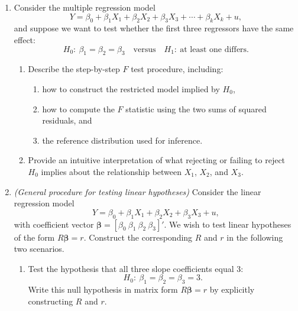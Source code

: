 \documentclass[12pt]{article}
\newcommand{\bs}[1]{\bm{#1}}
\renewcommand{\b}{\ensuremath{\bs{\beta}}}
\begin{document}
\begin{enumerate}
\begin{enumerate}\itemsep7em
\item Explain in words what this hypothesis is asking about the explanatory power of the regressors.
\item Describe step-by-step how to conduct the $F$ test for this hypothesis, including:
  \begin{enumerate}\itemsep6em
    \item the unrestricted and restricted models,  
    \item how to compute the $F$ statistic from the two sum of squared residuals, and  
    \item how to determine whether to reject $H_0$ at significance level $\alpha$.
  \end{enumerate}
\item Interpret the meaning of rejecting versus not rejecting $H_0$ in terms of the overall explanatory power of $X_1,\ldots,X_k$.
\end{enumerate}

\clearpage
\item Consider the multiple regression model
\[
Y = \beta_0 + \beta_1 X_1 + \beta_2 X_2 + \beta_3 X_3 + \cdots + \beta_k X_k + u,
\]
and suppose we want to test whether the first three regressors have the same effect:
\[
H_0:\ \beta_1=\beta_2=\beta_3 \quad \text{versus} \quad H_1:\ \text{at least one differs.}
\]

\begin{enumerate}\itemsep7em
\item Describe the step-by-step $F$ test procedure, including:
  \begin{enumerate}\itemsep6em
    \item how to construct the restricted model implied by $H_0$,
    \item how to compute the $F$ statistic using the two sums of squared residuals, and
    \item the reference distribution used for inference.
  \end{enumerate}
\item Provide an intuitive interpretation of what rejecting or failing to reject $H_0$ implies about the relationship between $X_1$, $X_2$, and $X_3$.
\end{enumerate}
\clearpage

\item \textit{(General procedure for testing linear hypotheses)} Consider the linear regression model
\[
Y = \beta_0 + \beta_1 X_1 + \beta_2 X_2 + \beta_3 X_3 + u,
\]
with coefficient vector $\b = [\beta_0\ \beta_1\ \beta_2\ \beta_3]'$. We wish to test linear hypotheses of the form $R\b=r$. Construct the corresponding $R$ and $r$ in the following two scenarios.
\begin{enumerate}\itemsep14em
\item Test the hypothesis that all three slope coefficients equal 3:
\[
H_0:\ \beta_1=\beta_2=\beta_3=3.
\]
Write this null hypothesis in matrix form $R\b=r$ by explicitly constructing $R$ and $r$.


\end{enumerate}
\end{enumerate}
\end{document}
